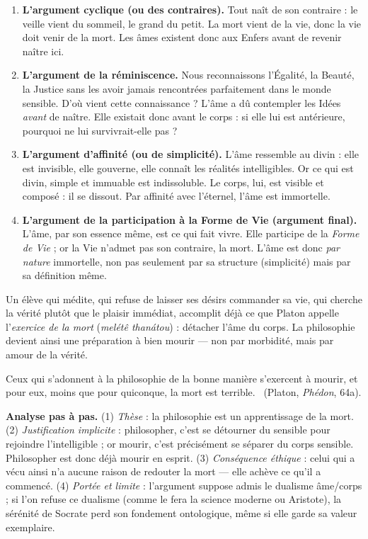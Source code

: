\documentclass[11pt]{article}
\begin{document}
\begin{enumerate}
\item \textbf{L'argument cyclique (ou des contraires).} Tout naît de son contraire : le veille vient du sommeil, le grand du petit. La mort vient de la vie, donc la vie doit venir de la mort. Les âmes existent donc aux Enfers avant de revenir naître ici.
\item \textbf{L'argument de la réminiscence.} Nous reconnaissons l'Égalité, la Beauté, la Justice sans les avoir jamais rencontrées parfaitement dans le monde sensible. D'où vient cette connaissance ? L'âme a dû contempler les Idées \emph{avant} de naître. Elle existait donc avant le corps : si elle lui est antérieure, pourquoi ne lui survivrait-elle pas ?
\item \textbf{L'argument d'affinité (ou de simplicité).} L'âme ressemble au divin : elle est invisible, elle gouverne, elle connaît les réalités intelligibles. Or ce qui est divin, simple et immuable est indissoluble. Le corps, lui, est visible et composé : il se dissout. Par affinité avec l'éternel, l'âme est immortelle.
\item \textbf{L'argument de la participation à la Forme de Vie (argument final).} L'âme, par son essence même, est ce qui fait vivre. Elle participe de la \emph{Forme de Vie} ; or la Vie n'admet pas son contraire, la mort. L'âme est donc \emph{par nature} immortelle, non pas seulement par sa structure (simplicité) mais par sa définition même.
\end{enumerate}

\begin{exemplebox}
Un élève qui médite, qui refuse de laisser ses désirs commander sa vie, qui cherche la vérité plutôt que le plaisir immédiat, accomplit déjà ce que Platon appelle l'\emph{exercice de la mort} (\emph{melétê thanátou}) : détacher l'âme du corps. La philosophie devient ainsi une préparation à bien mourir — non par morbidité, mais par amour de la vérité.
\end{exemplebox}

\begin{experience}
\guillemotleft Ceux qui s'adonnent à la philosophie de la bonne manière s'exercent à mourir, et pour eux, moins que pour quiconque, la mort est terrible. \guillemotright\ (Platon, \emph{Phédon}, 64a).

\textbf{Analyse pas à pas.} (1) \emph{Thèse} : la philosophie est un apprentissage de la mort. (2) \emph{Justification implicite} : philosopher, c'est se détourner du sensible pour rejoindre l'intelligible ; or mourir, c'est précisément se séparer du corps sensible. Philosopher est donc déjà mourir en esprit. (3) \emph{Conséquence éthique} : celui qui a vécu ainsi n'a aucune raison de redouter la mort — elle achève ce qu'il a commencé. (4) \emph{Portée et limite} : l'argument suppose admis le dualisme âme/corps ; si l'on refuse ce dualisme (comme le fera la science moderne ou Aristote), la sérénité de Socrate perd son fondement ontologique, même si elle garde sa valeur exemplaire.
\end{experience}
\end{document}
